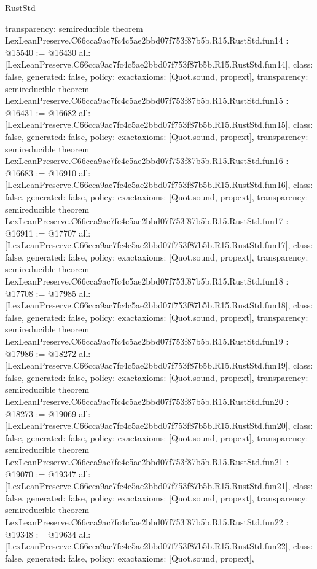 \begin{lexlean}{RustStd}
\begin{coremodule}
{  transparency: semireducible
}
theorem LexLeanPreserve.C66cca9ac7fc4c5ae2bbd07f753f87b5b.R15.RustStd.fun14 : @15540 := @16430 {
  all: [LexLeanPreserve.C66cca9ac7fc4c5ae2bbd07f753f87b5b.R15.RustStd.fun14],
  class: false,
  generated: false,
  policy: exact{axioms: [Quot.sound, propext]},
  transparency: semireducible
}
theorem LexLeanPreserve.C66cca9ac7fc4c5ae2bbd07f753f87b5b.R15.RustStd.fun15 : @16431 := @16682 {
  all: [LexLeanPreserve.C66cca9ac7fc4c5ae2bbd07f753f87b5b.R15.RustStd.fun15],
  class: false,
  generated: false,
  policy: exact{axioms: [Quot.sound, propext]},
  transparency: semireducible
}
theorem LexLeanPreserve.C66cca9ac7fc4c5ae2bbd07f753f87b5b.R15.RustStd.fun16 : @16683 := @16910 {
  all: [LexLeanPreserve.C66cca9ac7fc4c5ae2bbd07f753f87b5b.R15.RustStd.fun16],
  class: false,
  generated: false,
  policy: exact{axioms: [Quot.sound, propext]},
  transparency: semireducible
}
theorem LexLeanPreserve.C66cca9ac7fc4c5ae2bbd07f753f87b5b.R15.RustStd.fun17 : @16911 := @17707 {
  all: [LexLeanPreserve.C66cca9ac7fc4c5ae2bbd07f753f87b5b.R15.RustStd.fun17],
  class: false,
  generated: false,
  policy: exact{axioms: [Quot.sound, propext]},
  transparency: semireducible
}
theorem LexLeanPreserve.C66cca9ac7fc4c5ae2bbd07f753f87b5b.R15.RustStd.fun18 : @17708 := @17985 {
  all: [LexLeanPreserve.C66cca9ac7fc4c5ae2bbd07f753f87b5b.R15.RustStd.fun18],
  class: false,
  generated: false,
  policy: exact{axioms: [Quot.sound, propext]},
  transparency: semireducible
}
theorem LexLeanPreserve.C66cca9ac7fc4c5ae2bbd07f753f87b5b.R15.RustStd.fun19 : @17986 := @18272 {
  all: [LexLeanPreserve.C66cca9ac7fc4c5ae2bbd07f753f87b5b.R15.RustStd.fun19],
  class: false,
  generated: false,
  policy: exact{axioms: [Quot.sound, propext]},
  transparency: semireducible
}
theorem LexLeanPreserve.C66cca9ac7fc4c5ae2bbd07f753f87b5b.R15.RustStd.fun20 : @18273 := @19069 {
  all: [LexLeanPreserve.C66cca9ac7fc4c5ae2bbd07f753f87b5b.R15.RustStd.fun20],
  class: false,
  generated: false,
  policy: exact{axioms: [Quot.sound, propext]},
  transparency: semireducible
}
theorem LexLeanPreserve.C66cca9ac7fc4c5ae2bbd07f753f87b5b.R15.RustStd.fun21 : @19070 := @19347 {
  all: [LexLeanPreserve.C66cca9ac7fc4c5ae2bbd07f753f87b5b.R15.RustStd.fun21],
  class: false,
  generated: false,
  policy: exact{axioms: [Quot.sound, propext]},
  transparency: semireducible
}
theorem LexLeanPreserve.C66cca9ac7fc4c5ae2bbd07f753f87b5b.R15.RustStd.fun22 : @19348 := @19634 {
  all: [LexLeanPreserve.C66cca9ac7fc4c5ae2bbd07f753f87b5b.R15.RustStd.fun22],
  class: false,
  generated: false,
  policy: exact{axioms: [Quot.sound, propext]},
}
\end{coremodule}
\end{lexlean}
